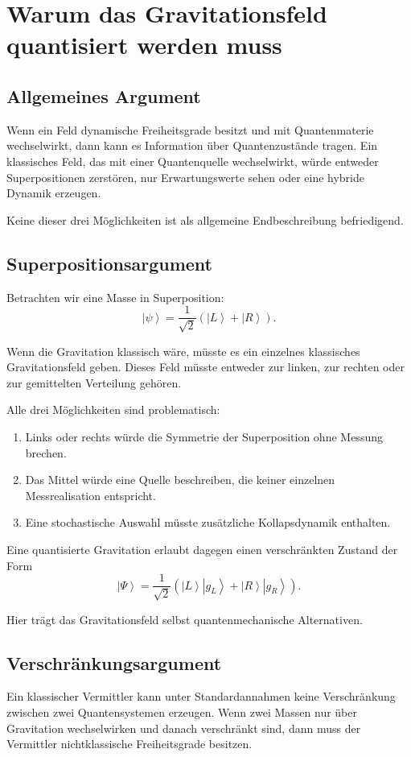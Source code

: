 \documentclass[11pt,a4paper,oneside]{book}
\theoremstyle{definition}
\theoremstyle{plain}
\theoremstyle{remark}
\newcommand{\ket}[1]{\left|#1\right\rangle}
\begin{document}
\chapter{Warum das Gravitationsfeld quantisiert werden muss}
\section{Allgemeines Argument}
Wenn ein Feld dynamische Freiheitsgrade besitzt und mit Quantenmaterie wechselwirkt, dann kann es Information über Quantenzustände tragen. Ein klassisches Feld, das mit einer Quantenquelle wechselwirkt, würde entweder Superpositionen zerstören, nur Erwartungswerte sehen oder eine hybride Dynamik erzeugen.

Keine dieser drei Möglichkeiten ist als allgemeine Endbeschreibung befriedigend.

\section{Superpositionsargument}
Betrachten wir eine Masse in Superposition:
\[
\ket{\psi}=\frac{1}{\sqrt2}(\ket{L}+\ket{R}).
\]

Wenn die Gravitation klassisch wäre, müsste es ein einzelnes klassisches Gravitationsfeld geben. Dieses Feld müsste entweder zur linken, zur rechten oder zur gemittelten Verteilung gehören.

Alle drei Möglichkeiten sind problematisch:

\begin{enumerate}[label=\arabic*.]
\item Links oder rechts würde die Symmetrie der Superposition ohne Messung brechen.
\item Das Mittel würde eine Quelle beschreiben, die keiner einzelnen Messrealisation entspricht.
\item Eine stochastische Auswahl müsste zusätzliche Kollapsdynamik enthalten.
\end{enumerate}

Eine quantisierte Gravitation erlaubt dagegen einen verschränkten Zustand der Form
\[
\ket{\Psi}=\frac{1}{\sqrt2}(\ket{L}\ket{g_L}+\ket{R}\ket{g_R}).
\]

Hier trägt das Gravitationsfeld selbst quantenmechanische Alternativen.

\section{Verschränkungsargument}
Ein klassischer Vermittler kann unter Standardannahmen keine Verschränkung zwischen zwei Quantensystemen erzeugen. Wenn zwei Massen nur über Gravitation wechselwirken und danach verschränkt sind, dann muss der Vermittler nichtklassische Freiheitsgrade besitzen.
\end{document}
